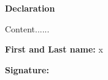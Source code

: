 \thispagestyle{plain}
\begin{flushleft}
    \Huge
    \textbf{Declaration}    
\end{flushleft}
\vspace{1cm}
Content......

\begin{flushleft}
\vspace{1cm}
\textbf{First and Last name:} x

\vspace{1cm}
\textbf{Signature:}    
\end{flushleft}